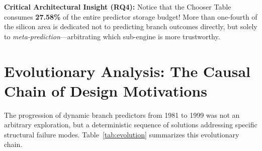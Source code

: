 \documentclass[11pt,a4paper]{article}
\begin{document}
\begin{table}[htbp]
\centering
\caption{Detailed silicon state-bit budget of the DEC Alpha 21264 tournament branch predictor.}
\label{tab:alpha_budget}
\vspace{0.5em}
\small
{}
\end{table}

\vspace{0.5em}
\noindent\textbf{Critical Architectural Insight (RQ4):} Notice that the Chooser Table consumes \textbf{27.58\%} of the entire predictor storage budget! More than one-fourth of the silicon area is dedicated not to predicting branch outcomes directly, but solely to \textit{meta-prediction}---arbitrating which sub-engine is more trustworthy.

\section{Evolutionary Analysis: The Causal Chain of Design Motivations}
\label{sec:evolution}

The progression of dynamic branch predictors from 1981 to 1999 was not an arbitrary exploration, but a deterministic sequence of solutions addressing specific structural failure modes. Table~\ref{tab:evolution} summarizes this evolutionary chain.
\end{document}
